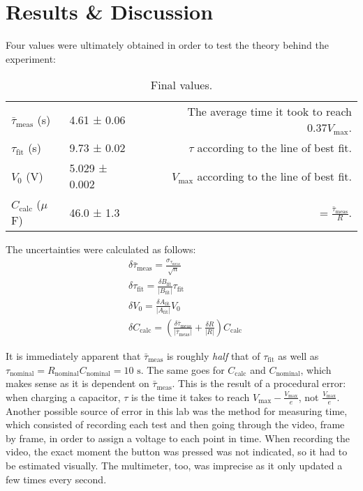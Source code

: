 \documentclass{report}
\begin{document}
\section{Results \& Discussion}
	Four values were ultimately obtained in order to test the theory behind the experiment:\\
	
	\begin{table}[H]
		\centering
		\caption{Final values.}
		\begin{tabular}{@{}l|lr@{}}
			\toprule
			$\bar{\tau}_\mathrm{meas}$ (s)   & 4.61 ± 0.06 & The average time it took to reach $0.37V_\mathrm{max}$. \\
			$\tau_\mathrm{fit}$ (s) & 9.73 ± 0.02   & $\tau$ according to the line of best fit.           \\
			$V_0$ (V)               & 5.029 ± 0.002 & $V_\mathrm{max}$ according to the line of best fit. \\
			$C_\mathrm{calc}$ ($\mu$F) & 46.0 ± 1.3  & $= \frac{\bar{\tau}_\mathrm{meas}}{R}$.   \\ \bottomrule
		\end{tabular}
	\end{table}
	
	The uncertainties were calculated as follows:
	\begin{align*}
		&\delta\bar{\tau}_\mathrm{meas} = \frac{\sigma_{\tau_\mathrm{meas}}}{\sqrt{n}}\\
		&\delta\tau_\mathrm{fit}  = \frac{\delta B_\mathrm{fit}}{|B_\mathrm{fit}|}\tau_\mathrm{fit}\\
		&\delta V_0				 = \frac{\delta A_\mathrm{fit}}{|A_\mathrm{fit}|}V_0\\
		&\delta C_\mathrm{calc}	 = \left(\frac{\delta\bar{\tau}_\mathrm{meas}}{|\bar{\tau}_\mathrm{meas}|} + \frac{\delta R}{|R|}\right)C_\mathrm{calc}
	\end{align*}
	
	It is immediately apparent that $\bar{\tau}_\mathrm{meas}$ is roughly \emph{half} that of $\tau_\mathrm{fit}$ as well as $\tau_\mathrm{nominal} = R_\mathrm{nominal}C_\mathrm{nominal} = 10 \text{ s}$.
	The same goes for $C_\mathrm{calc}$ and $C_\mathrm{nominal}$, which makes sense as it is dependent on $\bar{\tau}_\mathrm{meas}$.
	This is the result of a procedural error: when charging a capacitor, $\tau$ is the time it takes to reach $V_\mathrm{max} - \frac{V_\mathrm{max}}{e}$, not $\frac{V_\mathrm{max}}{e}$.
	Another possible source of error in this lab was the method for measuring time, which consisted of recording each test and then going through the video, frame by frame, in order to assign a voltage to each point in time.
	When recording the video, the exact moment the button was pressed was not indicated, so it had to be estimated visually. The multimeter, too, was imprecise as it only updated a few times every second.
	
\end{document}
